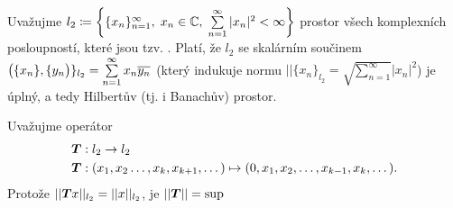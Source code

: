 \Priklad 
Uvažujme $l_2\coloneqq \left \{ \{x_n\}_{n=1}^\infty,\; x_n\in\mathbb{C},\;\sum\limits_{n=1}^\infty|x_n|^2<\infty \right \}$ prostor všech komplexních posloupností, které jsou tzv. . Platí, že $l_2$ se skalárním součinem $\big( \{x_n\}, \{y_n \big)\}_{l_2}=\sum\limits_{n=1}^\infty x_n\overline{y_n}$ (který indukuje normu $||\{x_n\}_{l_2}=\sqrt{\sum_{n=1}^\infty}|x_n|^2$) je úplný, a tedy Hilbertův (tj. i Banachův) prostor.

Uvažujme operátor 
\begin{align*}
    \boldsymbol{T}&:l_2\rightarrow l_2\\
    \boldsymbol{T}&:(x_1,x_2\dots,x_k,x_{k+1},\dots)\mapsto (0,x_1,x_2,\dots,x_{k-1},x_k,\dots).
\end{align*}
Protože $||\boldsymbol{T} x ||_{l_2}=||x||_{l_2}$, je $||\boldsymbol{T}||=\sup$




\pagebreak
